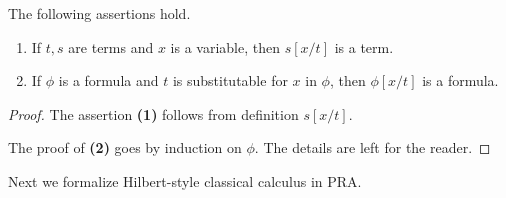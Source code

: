 \documentclass[10pt]{amsart}
\begin{document}
\begin{fact}\label{fact:substitution_in_term_produces_term_and_substititution_in_formula_produces_formula}
	The following assertions hold.
	\begin{enumerate}[label=\emph{\textbf{(\arabic*)}}, leftmargin=3.0em]
		\item If $t,s$ are terms and $x$ is a variable, then $s[x/t]$ is a term.
		\item If $\phi$ is a formula and $t$ is substitutable for $x$ in $\phi$, then $\phi[x/t]$ is a formula.
	\end{enumerate}
\end{fact}
\begin{proof}
	The assertion \textbf{(1)} follows from definition $s[x/t]$.

	The proof of \textbf{(2)} goes by induction on $\phi$. The details are left for the reader.
\end{proof}
\noindent
Next we formalize Hilbert-style classical calculus in $\mathrm{PRA}$.
\end{document}
